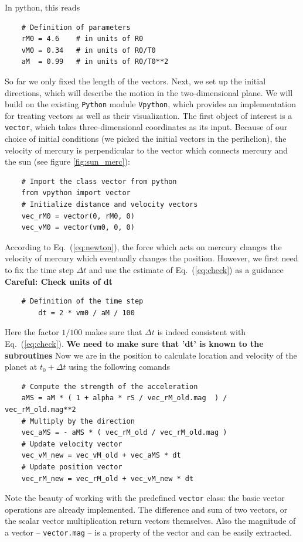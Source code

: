 \documentclass[12pt]{iopart}
\newcommand{\python}[0]{\texttt{Python} }
\begin{document}
In python, this reads
\begin{lstlisting}
	# Definition of parameters
	rM0 = 4.6    # in units of R0
	vM0 = 0.34   # in units of R0/T0
	aM  = 0.99   # in units of R0/T0**2
\end{lstlisting}
So far we only fixed the length of the vectors.
Next, we set up the initial directions, which will describe the motion in the two-dimensional plane.  We will build on the existing \python module \texttt{Vpython}, which provides  an implementation for treating vectors as well as their visualization.
The first object of interest is a \texttt{vector}, which takes three-dimensional coordinates as its input.  Because of our choice of initial conditions (we picked the initial vectors in the perihelion), the velocity of mercury is perpendicular to the vector which connects mercury and the sun (see figure \ref{fig:sun_merc}):
\begin{lstlisting}
	# Import the class vector from python
	from vpython import vector
	# Initialize distance and velocity vectors
	vec_rM0 = vector(0, rM0, 0)
	vec_vM0 = vector(vm0, 0, 0)
\end{lstlisting}
According to Eq.~(\ref{eq:newton}), the force which acts on mercury changes the velocity of mercury which eventually changes the position. However, we first need to fix the time step $\Delta t$ and use the estimate
of Eq.~(\ref{eq:check}) as a guidance {\bf Careful: Check units of dt}
\begin{lstlisting}
	# Definition of the time step
        dt = 2 * vm0 / aM / 100
\end{lstlisting}
Here the factor $1/100$ makes sure that $\Delta t$ is indeed
consistent with Eq.~(\ref{eq:check}).  {\bf We need to make sure that 'dt' is known
to the subroutines}
Now we are in the position to calculate
location and velocity of the planet at $t_0+\Delta t$ using the following comands
\begin{lstlisting}
	# Compute the strength of the acceleration
	aMS = aM * ( 1 + alpha * rS / vec_rM_old.mag  ) / vec_rM_old.mag**2
	# Multiply by the direction
	vec_aMS = - aMS * ( vec_rM_old / vec_rM_old.mag )
	# Update velocity vector
	vec_vM_new = vec_vM_old + vec_aMS * dt
	# Update position vector
	vec_rM_new = vec_rM_old + vec_vM_new * dt
\end{lstlisting}
Note the beauty of working with the predefined \texttt{vector} class: the basic vector operations are already implemented.  The difference and sum of two vectors, or the scalar vector multiplication return vectors themselves.  Also the magnitude of a vector -- \texttt{vector.mag} -- is a property of the vector and can be easily extracted.
\end{document}
